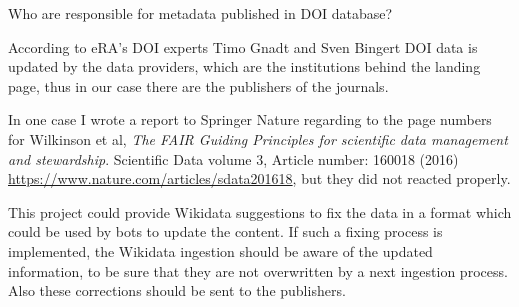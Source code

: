 Who are responsible for metadata published in DOI database?

According to eRA's DOI experts Timo Gnadt and Sven Bingert DOI data is updated by the data providers, which are the institutions behind the landing page, thus in our case there are the publishers of the journals.

In one case I wrote a report to Springer Nature regarding to the page numbers for Wilkinson et al, \emph{The FAIR Guiding Principles for scientific data management and stewardship}. Scientific Data volume 3, Article number: 160018 (2016) \url{https://www.nature.com/articles/sdata201618}, but they did not reacted properly.

This project could provide Wikidata suggestions to fix the data in a format which could be used by bots to update the content. If such a fixing process is implemented, the Wikidata ingestion should be aware of the updated information, to be sure that they are not overwritten by a next ingestion process. Also these corrections should be sent to the publishers.